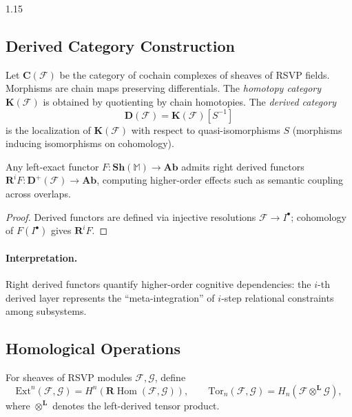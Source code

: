 \documentclass[12pt,a4paper]{article}
\begin{document}
\begin{spacing}{1.15}
\subsection{Derived Category Construction}

\begin{definition}
\label{def:derived}
Let \(\mathbf{C}(\mathscr{F})\) be the category of cochain complexes of sheaves of RSVP fields.
Morphisms are chain maps preserving differentials.
The \emph{homotopy category} \(\mathbf{K}(\mathscr{F})\)
is obtained by quotienting by chain homotopies.
The \emph{derived category}
\[
  \mathbf{D}(\mathscr{F})
   = \mathbf{K}(\mathscr{F})[S^{-1}]
\]
is the localization of \(\mathbf{K}(\mathscr{F})\)
with respect to quasi-isomorphisms \(S\)
(morphisms inducing isomorphisms on cohomology).
\end{definition}

\begin{proposition}
\label{prop:functoriality}
Any left-exact functor \(F:\mathbf{Sh}(\mathbb{M})\to\mathbf{Ab}\)
admits right derived functors
\(\mathbf{R}^iF:\mathbf{D}^+(\mathscr{F})\to\mathbf{Ab}\),
computing higher-order effects such as semantic coupling across overlaps.
\end{proposition}

\begin{proof}
Derived functors are defined via injective resolutions
\(\mathscr{F}\to I^\bullet\);
cohomology of \(F(I^\bullet)\) gives \(\mathbf{R}^iF\).
\end{proof}

\paragraph{Interpretation.}
Right derived functors quantify higher-order cognitive dependencies:
the \(i\)-th derived layer represents the “meta-integration”
of \(i\)-step relational constraints among subsystems.

\subsection{Homological Operations}

\begin{definition}
\label{def:ext-tor}
For sheaves of RSVP modules \(\mathscr{F},\mathscr{G}\),
define
\[
  \mathrm{Ext}^n(\mathscr{F},\mathscr{G})
  = H^n(\mathbf{R}\!\operatorname{Hom}(\mathscr{F},\mathscr{G})),
  \qquad
  \mathrm{Tor}_n(\mathscr{F},\mathscr{G})
  = H_n(\mathscr{F}\otimes^{\mathbf{L}}\mathscr{G}),
\]
where \(\otimes^{\mathbf{L}}\) denotes the left-derived tensor product.
\end{definition}


\end{spacing}
\end{document}
